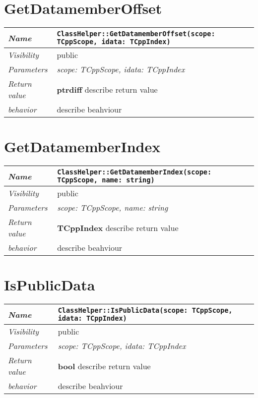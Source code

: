  \section{GetDatamemberOffset}
\begin{longtable}{p{3cm} @{\hskip 1cm} p{12cm}}
 \hline
\textit{Name} & \texttt{ClassHelper::GetDatamemberOffset(scope: TCppScope, idata: TCppIndex)}\\
\hline
 \textit{Visibility} & public\\
\hline
\textit{Parameters} & \textit{scope: TCppScope, idata: TCppIndex}\\
\hline
\textit{Return value} & \textbf{ ptrdiff} describe return value\\
  \hline
 \textit{behavior} & describe beahviour \\
\hline
\end{longtable} \pagebreak
 \section{GetDatamemberIndex}
\begin{longtable}{p{3cm} @{\hskip 1cm} p{12cm}}
 \hline
\textit{Name} & \texttt{ClassHelper::GetDatamemberIndex(scope: TCppScope, name: string)}\\
\hline
 \textit{Visibility} & public\\
\hline
\textit{Parameters} & \textit{scope: TCppScope, name: string}\\
\hline
\textit{Return value} & \textbf{ TCppIndex} describe return value\\
  \hline
 \textit{behavior} & describe beahviour \\
\hline
\end{longtable} \pagebreak
 \section{IsPublicData}
\begin{longtable}{p{3cm} @{\hskip 1cm} p{12cm}}
 \hline
\textit{Name} & \texttt{ClassHelper::IsPublicData(scope: TCppScope, idata: TCppIndex)}\\
\hline
 \textit{Visibility} & public\\
\hline
\textit{Parameters} & \textit{scope: TCppScope, idata: TCppIndex}\\
\hline
\textit{Return value} & \textbf{ bool} describe return value\\
  \hline
 \textit{behavior} & describe beahviour \\
\hline
\end{longtable} \pagebreak
